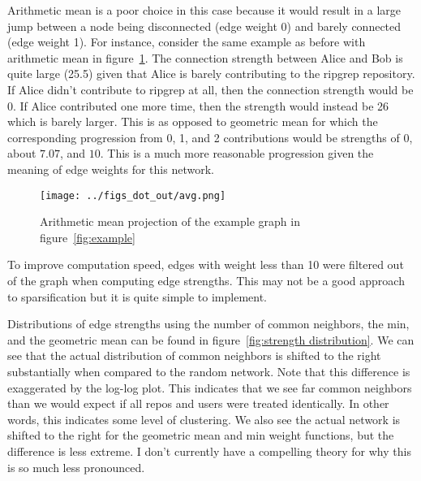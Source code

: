 \documentclass{pset}
\begin{document}
Arithmetic mean is a poor choice in this case because it would result in a
large jump between
a node being disconnected (edge weight 0) and barely connected (edge weight 1).
For instance, consider the same example as before with arithmetic mean
in figure~\ref{fig:mean}. The connection strength between Alice and Bob is quite
large (25.5) given that Alice is barely contributing to the ripgrep repository.
If Alice didn't contribute to ripgrep at all, then the connection strength would
be 0. If Alice contributed one more time, then the strength would instead be 26
which is barely larger. This is as opposed to geometric mean
for which the corresponding progression from 0, 1, and 2 contributions would be
strengths of 0, about $7.07$, and $10$. This is a much more reasonable progression
given the meaning of edge weights for this network.

\begin{figure}[ht]
\centering
\texttt{[image: ../figs\_dot\_out/avg.png]}
\caption{Arithmetic mean projection of the example graph in figure~\ref{fig:example}}\label{fig:mean}
\end{figure}

To improve computation speed, edges
with weight less than 10 were filtered out of the graph
when computing edge strengths. This may not be
a good approach to sparsification but it is quite simple to implement.

Distributions of edge strengths using the number of
common neighbors, the min, and the geometric mean can be found in
figure~\ref{fig:strength distribution}.  
We can see that
the actual distribution of common neighbors is shifted to the right
substantially when compared to the random network. Note that this
difference is exaggerated by the log-log plot. This indicates that we see far
common neighbors than we would expect if all repos and users were treated
identically. In other words, this indicates some level of clustering.  We also
see the actual network is shifted to the right for the geometric mean and min
weight functions, but the difference is less extreme.  I don't currently have a
compelling theory for why this is so much less pronounced. 
\end{document}
